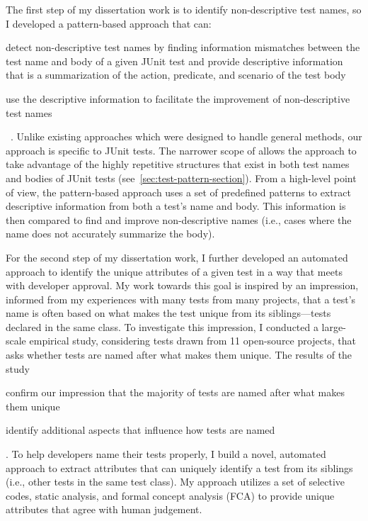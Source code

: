 The first step of my dissertation work is to identify non-descriptive test names, so I developed a pattern-based approach that can:
\begin{enumerate*}
\item detect non-descriptive test names by finding information mismatches between the test name and body of a given JUnit test and provide descriptive information that is a summarization of the action, predicate, and scenario of the test body
\item use the descriptive information to facilitate the improvement of non-descriptive test names
\end{enumerate*}~\cite{wu2020pattern}.
%
Unlike existing approaches which were designed to handle general methods, our approach is specific to JUnit tests.
%
The narrower scope of allows the approach to take advantage of the highly repetitive structures that exist in both test names and bodies of JUnit tests (see~\cref{sec:test-pattern-section}).
%
From a high-level point of view, the pattern-based approach uses a set of predefined patterns to extract descriptive information from both a test's name and body.
%
This information is then compared to find and improve non-descriptive names (i.e., cases where the name does not accurately summarize the body).


For the second step of my dissertation work, I further developed an automated approach to identify the unique attributes of a given test in a way that meets with developer approval.
%
My work towards this goal is inspired by an impression, informed from my experiences with many tests from many projects, that a test's name is often based on what makes the test unique from its siblings---tests declared in the same class.
%
To investigate this impression, I conducted a large-scale empirical study, considering tests drawn from \num{11} open-source projects, that asks whether tests are named after what makes them unique.
%
The results of the study
\begin{enumerate*}
\item confirm our impression that the majority of tests are named after what makes them unique
\item identify additional aspects that influence how tests are named
\end{enumerate*}.
%
To help developers name their tests properly, I build a novel, automated approach to extract attributes that can uniquely identify a test from its siblings (i.e., other tests in the same test class).
% 
My approach utilizes a set of selective codes, static analysis, and formal concept analysis (FCA) to provide unique attributes that agree with human judgement.


